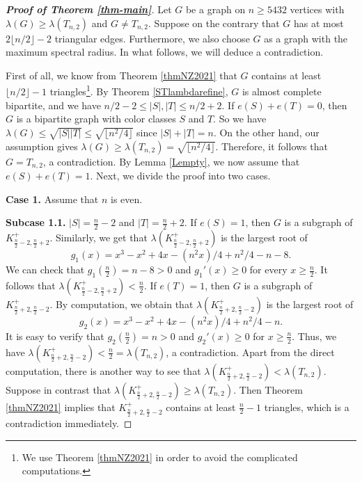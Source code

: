 \documentclass[11pt]{article}
\begin{document}
\begin{proof}[{\bf Proof of Theorem \ref{thm-main}}] 
Let $G$ be a graph on $n\ge 5432$ vertices with $\lambda (G)\ge \lambda (T_{n,2})$ and $G\neq T_{n,2}$. 
Suppose on the contrary that $G$ has at most $2 \lfloor n/2 \rfloor -2$ triangular edges. 
Furthermore, we also choose $G$ as a graph with the maximum spectral radius. In what follows, we will deduce a contradiction.  

\medskip 
First of all, we know from Theorem \ref{thmNZ2021} that $G$ contains at least $\lfloor n/2\rfloor -1$ triangles\footnote{
We use Theorem \ref{thmNZ2021} in order to avoid the complicated computations.}. 
By Theorem \ref{STlambdarefine}, 
$G$ is almost complete bipartite, 
and we have $n/2 -2\le |S|,|T| \le n/2 +2$.  
If $e(S) + e(T)=0$, 
then $G$ is a bipartite graph with color classes $S$ and $T$. 
So we have $\lambda (G)\le \sqrt{|S||T|} 
\le \sqrt{\lfloor n^2/4\rfloor}$ 
since $|S| + |T|=n$. 
On the other hand, our assumption gives 
$\lambda (G)\ge \lambda (T_{n,2}) = \sqrt{\lfloor n^2/4\rfloor}$.
Therefore, it follows that $G=T_{n,2}$, a contradiction. 
By Lemma \ref{Lempty}, 
we now assume that $e(S) + e(T)=1$. 
Next, we divide the proof into two cases. 


\medskip 
{\bf Case 1.} Assume that $n$ is even. 


{\bf Subcase 1.1.}  $|S|= \frac{n}{2} -2$ and $|T|=\frac{n}{2} +2$. 
 If $e(S)=1$, then $G$ is a subgraph of $K_{\frac{n}{2} -2, \frac{n}{2} +2}^+$.  
Similarly, we get that 
$\lambda (K_{\frac{n}{2} -2, \frac{n}{2} +2}^+) $ is the largest root of 
\[  g_1(x)=x^3 -x^2 + 4 x- (n^2x)/4  + n^2/4 -n -8. \]
We can check that $g_1(\frac{n}{2}) = n-8 >0$ and 
$g_1'(x) \ge 0$ for every $x\ge \frac{n}{2}$. It follows that 
$ \lambda (K_{\frac{n}{2} -2, \frac{n}{2} +2}^+) < \frac{n}{2}$. 
If $e(T)=1$, then $G$ is a subgraph of $K_{\frac{n}{2} +2, \frac{n}{2} -2}^+$. By computation, we obtain that $\lambda (K_{\frac{n}{2} +2, \frac{n}{2} -2}^+) $ is the largest root of 
\[   g_2(x)= x^3 -x^2 + 4x - (n^2 x)/4 + n^2/4 -n.   \]
It is easy to verify that $g_2(\frac{n}{2}) = n >0$ and $g_2'(x) \ge 0$ 
for $x\ge \frac{n}{2}$. Thus, we have $\lambda (K_{\frac{n}{2} +2, \frac{n}{2} -2}^+) < \frac{n}{2} = \lambda (T_{n,2})$, a contradiction. 
Apart from the direct computation, 
there is another way to see that 
$\lambda (K_{\frac{n}{2} +2, \frac{n}{2} -2}^+) < \lambda (T_{n,2})$. 
Suppose in contrast that $\lambda (K_{\frac{n}{2} +2, \frac{n}{2} -2}^+) \ge \lambda (T_{n,2})$. 
Then Theorem \ref{thmNZ2021} implies that $K_{\frac{n}{2} +2, \frac{n}{2} -2}^+$ contains at least 
$\frac{n}{2} -1$ triangles, which is a contradiction immediately. 


\end{proof}
\end{document}
